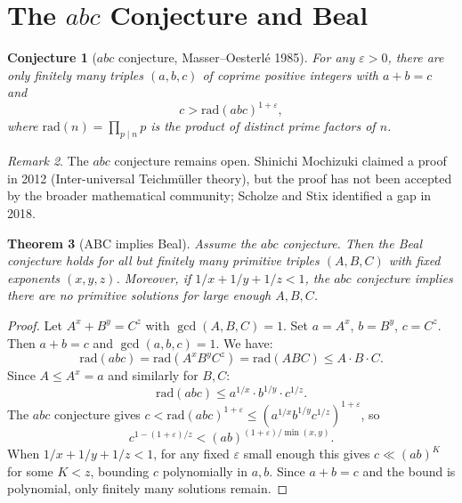 \documentclass[12pt,a4paper]{amsart}
\newtheorem{theorem}{Theorem}[section]
\newtheorem{conjecture}[theorem]{Conjecture}
\theoremstyle{definition}
\theoremstyle{remark}
\newtheorem{remark}[theorem]{Remark}
\begin{document}
\section{The \texorpdfstring{$abc$}{abc} Conjecture and Beal}

\begin{conjecture}[$abc$ conjecture, Masser--Oesterlé 1985]\label{conj:abc}
For any $\varepsilon > 0$, there are only finitely many triples $(a,b,c)$ of
coprime positive integers with $a + b = c$ and
\[
  c > \mathrm{rad}(abc)^{1+\varepsilon},
\]
where $\mathrm{rad}(n) = \prod_{p \mid n} p$ is the product of distinct prime factors of $n$.
\end{conjecture}

\begin{remark}
The $abc$ conjecture remains open. Shinichi Mochizuki claimed a proof in 2012
(Inter-universal Teichmüller theory), but the proof has not been accepted by
the broader mathematical community; Scholze and Stix identified a gap in 2018.
\end{remark}

\begin{theorem}[ABC implies Beal]\label{thm:abcBeal}
Assume the $abc$ conjecture. Then the Beal conjecture holds for all but finitely
many primitive triples $(A, B, C)$ with fixed exponents $(x, y, z)$. Moreover,
if $1/x + 1/y + 1/z < 1$, the $abc$ conjecture implies there are no primitive
solutions for large enough $A, B, C$.
\end{theorem}

\begin{proof}
Let $A^x + B^y = C^z$ with $\gcd(A,B,C) = 1$. Set $a = A^x$, $b = B^y$, $c = C^z$.
Then $a + b = c$ and $\gcd(a,b,c) = 1$. We have:
\[
  \mathrm{rad}(abc) = \mathrm{rad}(A^x B^y C^z) = \mathrm{rad}(A B C)
  \leq A \cdot B \cdot C.
\]
Since $A \leq A^x = a$ and similarly for $B, C$:
\[
  \mathrm{rad}(abc) \leq a^{1/x} \cdot b^{1/y} \cdot c^{1/z}.
\]
The $abc$ conjecture gives $c < \mathrm{rad}(abc)^{1+\varepsilon} \leq
(a^{1/x} b^{1/y} c^{1/z})^{1+\varepsilon}$, so
\[
  c^{1 - (1+\varepsilon)/z} < (ab)^{(1+\varepsilon)/\min(x,y)}.
\]
When $1/x + 1/y + 1/z < 1$, for any fixed $\varepsilon$ small enough this gives
$c \ll (ab)^K$ for some $K < z$, bounding $c$ polynomially in $a,b$. Since
$a + b = c$ and the bound is polynomial, only finitely many solutions remain.
\end{proof}
\end{document}
